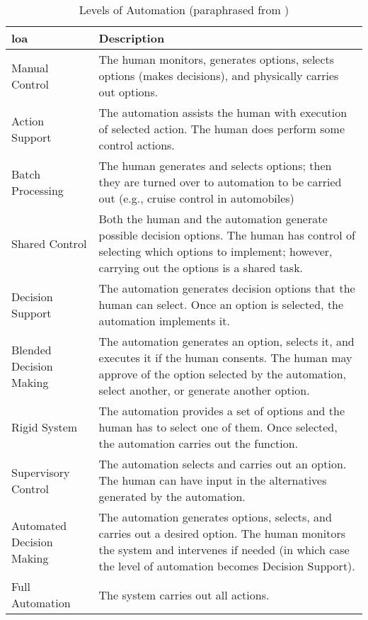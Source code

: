 \begin{table}\centering
  \caption[Levels of Automation]{Levels of Automation (paraphrased from \citet{Endsley1999})}
  \label{tab:autonomy_levels_endsley}
  \begin{tabularx}{\textwidth}{p{3cm} X}\toprule
    \gls{loa} & Description \\ \midrule
    Manual Control &
    The human monitors, generates options, selects options (makes decisions), and physically carries out options.\\
    Action Support &
    The automation assists the human with execution of selected action. The human does perform some control actions.\\
    Batch Processing &
    The human generates and selects options; then they are turned over to automation to be carried out (e.g., cruise control in automobiles)\\
    Shared Control &
    Both the human and the automation generate possible decision options. The human has control of selecting which options to implement; however, carrying out the options is a shared task.\\
    Decision Support &
    The automation generates decision options that the human can select. Once an option is selected, the automation implements it.\\
    Blended Decision Making & 
    The automation generates an option, selects it, and executes it if the human consents. The human may approve of the option selected by the automation, select another, or generate another option.\\
    Rigid System &      
    The automation provides a set of options and the human has to select one of them. Once selected, the automation carries out the function.\\
    Supervisory Control &
    The automation selects and carries out an option. The human can have input in the alternatives generated by the automation.\\
    Automated Decision Making & 
    The automation generates options, selects, and carries out a desired option. The human monitors the system and intervenes if needed (in which case the level of automation becomes Decision Support).\\
    Full Automation &   The system carries out all actions.\\ \bottomrule
  \end{tabularx}
\end{table}



